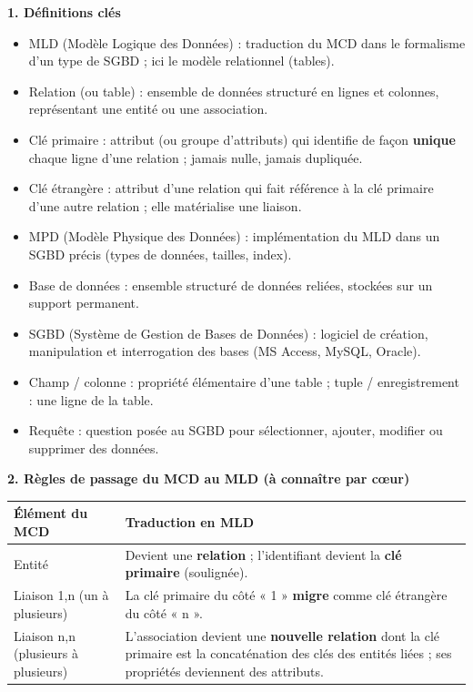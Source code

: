 \documentclass[11pt]{article}
\newcommand{\cle}[1]{{\popxbold\color{popdark}#1}}
\begin{document}
\begin{bilan}
\textbf{1. Définitions clés}
\begin{itemize}
  \item \cle{MLD} (Modèle Logique des Données) : traduction du MCD dans le formalisme d'un type de SGBD ; ici le \cle{modèle relationnel} (tables).
  \item \cle{Relation} (ou table) : ensemble de données structuré en lignes et colonnes, représentant une entité ou une association.
  \item \cle{Clé primaire} : attribut (ou groupe d'attributs) qui identifie de façon \textbf{unique} chaque ligne d'une relation ; jamais nulle, jamais dupliquée.
  \item \cle{Clé étrangère} : attribut d'une relation qui fait référence à la clé primaire d'une autre relation ; elle matérialise une liaison.
  \item \cle{MPD} (Modèle Physique des Données) : implémentation du MLD dans un SGBD précis (types de données, tailles, index).
  \item \cle{Base de données} : ensemble structuré de données reliées, stockées sur un support permanent.
  \item \cle{SGBD} (Système de Gestion de Bases de Données) : logiciel de création, manipulation et interrogation des bases (MS Access, MySQL, Oracle).
  \item \cle{Champ / colonne} : propriété élémentaire d'une table ; \cle{tuple / enregistrement} : une ligne de la table.
  \item \cle{Requête} : question posée au SGBD pour sélectionner, ajouter, modifier ou supprimer des données.
\end{itemize}

\textbf{2. Règles de passage du MCD au MLD (à connaître par c\oe ur)}
\begin{center}
\begin{tabularx}{\linewidth}{|l|X|}
\hline
\rowcolor{popblueL} \textbf{Élément du MCD} & \textbf{Traduction en MLD} \\
\hline
Entité & Devient une \textbf{relation} ; l'identifiant devient la \textbf{clé primaire} (soulignée). \\
\hline
Liaison 1,n (un à plusieurs) & La clé primaire du côté « 1 » \textbf{migre} comme clé étrangère du côté « n ». \\
\hline
Liaison n,n (plusieurs à plusieurs) & L'association devient une \textbf{nouvelle relation} dont la clé primaire est la concaténation des clés des entités liées ; ses propriétés deviennent des attributs. \\
\hline
\end{tabularx}
\end{center}


\end{bilan}
\end{document}
